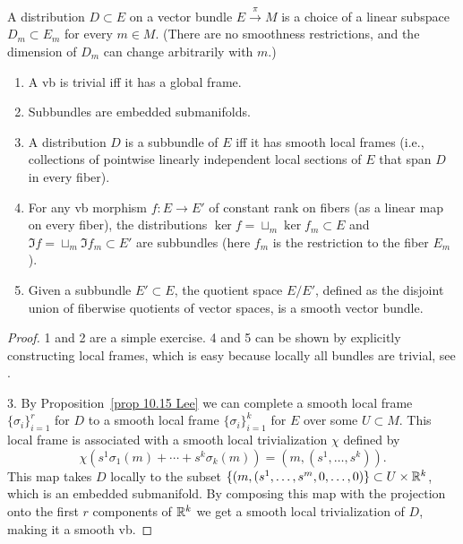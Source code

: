 \begin{defn}[Distribution]
    A distribution $D\subset E$ on a vector bundle $E\overset{\pi}{\to}M$ is a choice of a linear subspace $D_m\subset E_m$ for every $m\in M$. (There are no smoothness restrictions, and the dimension of $D_m$ can change arbitrarily with $m$.)
\end{defn}
\begin{thm}\label{subbundles thm}
\begin{enumerate}
    \item A \gls{vb} is trivial iff it has a global frame.
    \item Subbundles are embedded submanifolds.
    \item A distribution $D$ is a subbundle of $E$ iff it has smooth local frames (i.e., collections of pointwise linearly independent local sections of $E$ that span $D$ in every fiber).
    \item For any \gls{vb} morphism $f:E\to E'$ of constant rank on fibers (as a linear map on every fiber), the distributions $\ker f=\sqcup_m \ker f_m\subset E$ and $\Im f=\sqcup_m \Im f_m\subset E'$ are subbundles (here $f_m$ is the restriction to the fiber $E_m$).
    \item Given a subbundle $E'\subset E$,  the quotient space $E/E'$, defined as the disjoint union of fiberwise quotients of vector spaces, is a smooth vector bundle.
\end{enumerate}
\end{thm}
\begin{proof}
    1 and 2 are a simple exercise. 4 and 5 can be shown by explicitly constructing local frames, which is easy because locally all bundles are trivial, see \cite[Thm.~10.34]{Lee}.

    3. By Proposition~\ref{prop 10.15 Lee} we can complete a smooth local frame $\{\sigma_i\}_{i=1}^r$ for $D$ to a smooth local frame $\{\sigma_i\}_{i=1}^k$ for $E$ over some $U\subset M$. This local frame is associated with a smooth local trivialization $\chi$ defined by 
    \[\chi(s^1\sigma_1(m)+\cdots+s^k\sigma_k(m))=(m,(s^1,\ldots,s^k)).\]
    This map takes $D$ locally to the subset $\{(m,(s^1,\ldots,s^m,0,\ldots,0)\}\subset U\times \mathbb{R}^k$, which is an embedded submanifold. By composing this map with the projection onto the first $r$ components of $\mathbb{R}^k$ we get a smooth local trivialization of $D$, making it a smooth \gls{vb}.
\end{proof}



